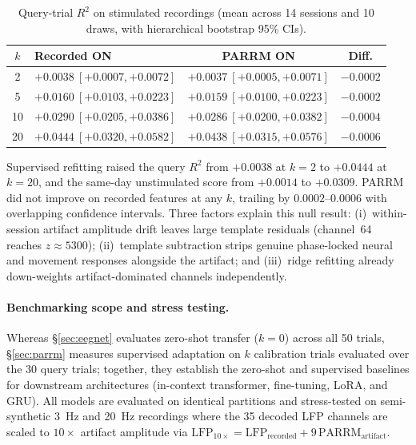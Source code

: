 \documentclass[11pt]{article}
\begin{document}
\begin{table}[htbp]\centering
\caption{Query-trial $R^2$ on stimulated recordings (mean across 14 sessions and 10 draws, with hierarchical bootstrap 95\% CIs).}
\begin{tabular}{@{}clcc@{}}\toprule
$k$ & Recorded ON & PARRM ON & Diff. \\ \midrule
2  & $+0.0038\ [+0.0007,+0.0072]$ & $+0.0037\ [+0.0005,+0.0071]$ & $-0.0002$ \\
5  & $+0.0160\ [+0.0103,+0.0223]$ & $+0.0159\ [+0.0100,+0.0223]$ & $-0.0002$ \\
10 & $+0.0290\ [+0.0205,+0.0386]$ & $+0.0286\ [+0.0200,+0.0382]$ & $-0.0004$ \\
20 & $+0.0444\ [+0.0320,+0.0582]$ & $+0.0438\ [+0.0315,+0.0576]$ & $-0.0006$ \\
\bottomrule\end{tabular}\label{tab:parrm}
\end{table}

Supervised refitting raised the query $R^2$ from $+0.0038$ at $k=2$ to $+0.0444$ at $k=20$, and the same-day unstimulated score from $+0.0014$ to $+0.0309$. PARRM did not improve on recorded features at any $k$, trailing by $0.0002\text{--}0.0006$ with overlapping confidence intervals. Three factors explain this null result: (i)~within-session artifact amplitude drift leaves large template residuals (channel~64 reaches $z \approx 5300$); (ii)~template subtraction strips genuine phase-locked neural and movement responses alongside the artifact; and (iii)~ridge refitting already down-weights artifact-dominated channels independently.

\paragraph{Benchmarking scope and stress testing.}
Whereas \S\ref{sec:eegnet} evaluates zero-shot transfer ($k=0$) across all 50 trials, \S\ref{sec:parrm} measures supervised adaptation on $k$ calibration trials evaluated over the 30 query trials; together, they establish the zero-shot and supervised baselines for downstream architectures (in-context transformer, fine-tuning, LoRA, and GRU). All models are evaluated on identical partitions and stress-tested on semi-synthetic 3~Hz and 20~Hz recordings where the 35 decoded LFP channels are scaled to $10\times$ artifact amplitude via $\text{LFP}_{10\times} = \text{LFP}_{\text{recorded}} + 9\,\text{PARRM}_{\text{artifact}}$.
\end{document}
